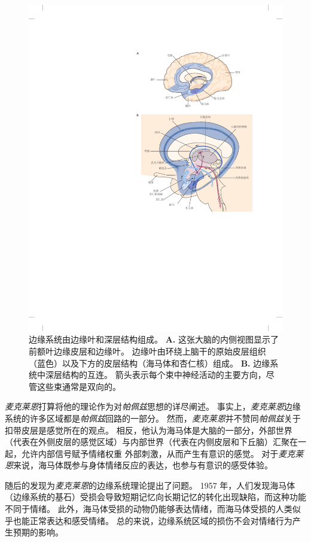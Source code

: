 \begin{figure}[htbp]
	\centering
	\includegraphics[width=0.85\linewidth]{chap42/fig_42_4}
	\caption{边缘系统由边缘叶和深层结构组成\cite{nieuwenhuys2007human}。
		\textbf{A.} 这张大脑的内侧视图显示了前额叶边缘皮层和边缘叶。
		边缘叶由环绕上脑干的原始皮层组织（蓝色）以及下方的皮层结构（海马体和杏仁核）组成。
		\textbf{B.} 边缘系统中深层结构的互连。
		箭头表示每个束中神经活动的主要方向，尽管这些束通常是双向的。}
	\label{fig:42_4}
\end{figure}


\textit{麦克莱恩}打算将他的理论作为对\textit{帕佩兹}思想的详尽阐述。
事实上，\textit{麦克莱恩}边缘系统的许多区域都是\textit{帕佩兹}回路的一部分。
然而，\textit{麦克莱恩}并不赞同\textit{帕佩兹}关于扣带皮层是感觉所在的观点。
相反，他认为海马体是大脑的一部分，外部世界（代表在外侧皮层的感觉区域）与内部世界（代表在内侧皮层和下丘脑）汇聚在一起，允许内部信号赋予情绪权重 外部刺激，从而产生有意识的感觉。
对于\textit{麦克莱恩}来说，海马体既参与身体情绪反应的表达，也参与有意识的感受体验。


随后的发现为\textit{麦克莱恩}的边缘系统理论提出了问题。
1957 年，人们发现海马体（边缘系统的基石）受损会导致短期记忆向长期记忆的转化出现缺陷，而这种功能不同于情绪。
此外，海马体受损的动物仍能够表达情绪，而海马体受损的人类似乎也能正常表达和感受情绪。
总的来说，边缘系统区域的损伤不会对情绪行为产生预期的影响。


